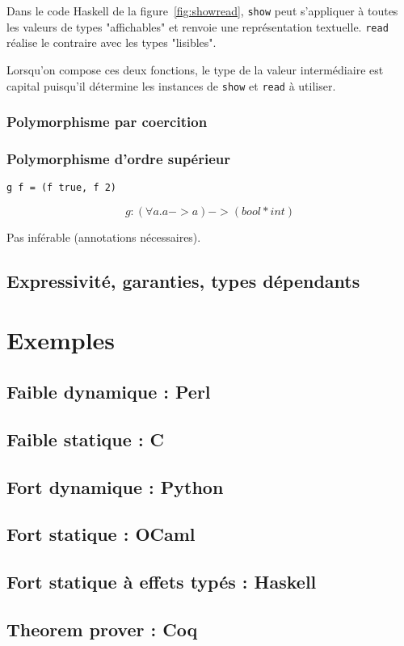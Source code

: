 Dans le code Haskell de la figure~\ref{fig:showread}, \texttt{show} peut
s'appliquer à toutes les valeurs de types "affichables" et renvoie une
représentation textuelle. \texttt{read} réalise le contraire avec les types
"lisibles".

Lorsqu'on compose ces deux fonctions, le type de la valeur intermédiaire est
capital puisqu'il détermine les instances de \texttt{show} et \texttt{read} à
utiliser.

\subsubsection{Polymorphisme par coercition}

\subsubsection{Polymorphisme d'ordre supérieur}

\begin{verbatim}
g f = (f true, f 2)
\end{verbatim}

\[
g : (\forall a . a -> a) -> (bool * int)
\]

Pas inférable (annotations nécessaires).

\subsection{Expressivité, garanties, types dépendants}

\section{Exemples}

\subsection{Faible dynamique : Perl}
\subsection{Faible statique : C}
\subsection{Fort dynamique : Python}
\subsection{Fort statique : OCaml}
\subsection{Fort statique à effets typés : Haskell}
\subsection{Theorem prover : Coq}

